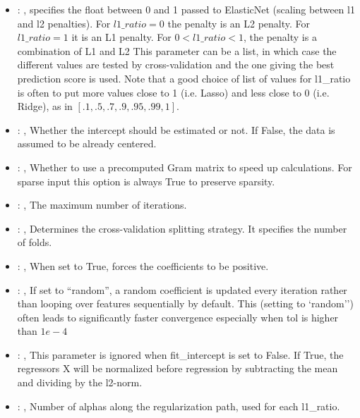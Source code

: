 \begin{itemize}
    \item {}: , 
      specifies the                                                  float between 0 and 1 passed to
      ElasticNet (scaling between l1 and l2 penalties).
      For $l1\_ratio = 0$ the penalty is an L2 penalty. For $l1\_ratio = 1$ it is
      an L1 penalty. For $0 < l1\_ratio < 1$, the penalty is a combination of L1
      and L2 This parameter can be a list, in which case the different values
      are tested by cross-validation and the one giving the best prediction score
      is used. Note that a good choice of list of values for l1\_ratio is often to
      put more values close to 1 (i.e. Lasso) and less close to 0 (i.e. Ridge),
      as in $[.1, .5, .7, .9, .95, .99, 1]$.

    \item {}: , 
      Whether the intercept should be estimated or not. If False,
      the data is assumed to be already centered.

    \item {}: , 
      Whether to use a precomputed Gram matrix to speed up calculations.
      For sparse input this option is always True to preserve sparsity.

    \item {}: , 
      The maximum number of iterations.

    \item {}: , 
      Determines the cross-validation splitting strategy.
      It specifies the number of folds.

    \item {}: , 
      When set to True, forces the coefficients to be positive.

    \item {}: , 
      If set to ``random'', a random coefficient is updated every iteration
      rather than looping over features sequentially by default. This (setting to `random'')
      often leads to significantly faster convergence especially when tol is higher than $1e-4$

    \item {}: , 
      This parameter is ignored when fit\_intercept is set to False. If True,
      the regressors X will be normalized before regression by subtracting the mean and
      dividing by the l2-norm.

    \item {}: , 
      Number of alphas along the regularization path,
      used for each l1\_ratio.
  \end{itemize}


